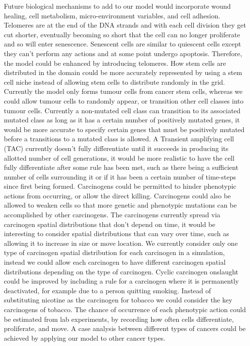 \documentclass[\main/thesis.tex]{subfiles}
\begin{document}
Future biological mechanisms to add to our model would incorporate wound healing, cell metabolism, micro-environment variables, and cell adhesion. \newline Telomeres are at the end of the DNA strands and with each cell division they get cut shorter, eventually becoming so short that the cell can no longer proliferate and so will enter senescence. Senescent cells are similar to quiescent cells except they can’t perform any actions and at some point undergo apoptosis. Therefore, the model could be enhanced by introducing telomeres. How stem cells are distributed in the domain could be more accurately represented by using a stem cell niche instead of allowing stem cells to distribute randomly in the grid. Currently the model only forms tumour cells from cancer stem cells, whereas we could allow tumour cells to randomly appear, or transition other cell classes into tumour cells. Currently a non-mutated cell class can transition to its associated mutated class as long as it has a certain number of positively mutated genes, it would be more accurate to specify certain genes that must be positively mutated before a transitions to a mutated class is allowed. A Transient amplifying cell (TAC) currently doesn't fully differentiate until it succeeds in producing its allotted number of cell generations, it would be more realistic to have the cell fully differentiate after some rule has been met, such as there being a sufficient number of cells surrounding it or if it has been a certain number of time-steps since first being formed. Carcinogens could be permitted to hinder phenotypic actions from occurring, or allow the direct killing. Carcinogens could also be allowed to weaken cells so that more genetic and phenotypic mutations can be accomplished by other carcinogens. The carcinogens currently spread via carcinogen spatial distributions that don't depend on time, it would be interesting to consider spatial distributions that can vary over time, such as allowing it to increase in size or move location. We currently consider only one type of carcinogen spatial distribution for each carcinogen in a simulation, instead we could allow each carcinogen to have different carcinogen spatial distributions depending on the type of carcinogen. Cyclic carcinogen onslaught could be improved by including a rule for a carcinogen where it is permanently deactivated, for example due to a person quitting smoking. Instead of substituting nicotine as the carcinogen for tobacco we could consider the key carcinogens of tobacco. The chance of occurrence of each phenotypic action could be estimated from lab experiments, by recording how often cells differentiate, proliferate, and move. A case analysis between different types of cancers could be achieved by applying our model to other cancer types. 
\end{document}
